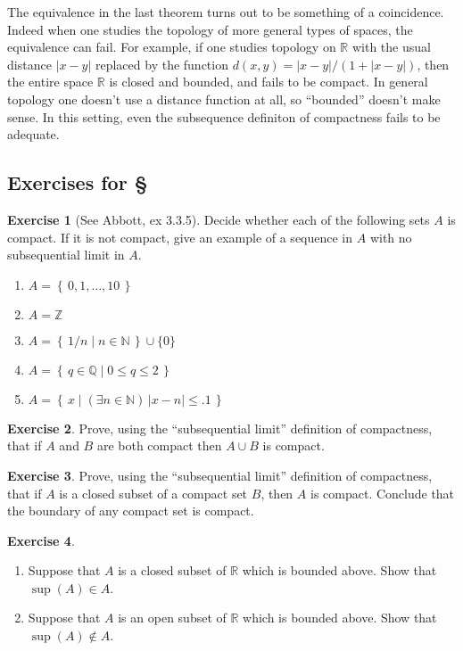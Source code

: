 \documentclass[11pt,oneside]{amsbook}
\newcommand{\set}[1]{\left\{\,#1\,\right\}}
\newcommand{\N}{\mathbb N}
\newcommand{\Z}{\mathbb Z}
\newcommand{\Q}{\mathbb Q}
\newcommand{\R}{\mathbb R}
\theoremstyle{definition}
\newtheorem{exerc}{Exercise}[section]
\theoremstyle{plain}
\theoremstyle{definition}
\theoremstyle{remark}
\numberwithin{equation}{section}
\numberwithin{figure}{section}
\begin{document}
The equivalence in the last theorem turns out to be something of a coincidence. Indeed when one studies the topology of more general types of spaces, the equivalence can fail. For example, if one studies topology on $\R$ with the usual distance $|x-y|$ replaced by the function $d(x,y)=|x-y|/(1+|x-y|)$, then the entire space $\R$ is closed and bounded, and fails to be compact. In general topology one doesn't use a distance function at all, so ``bounded'' doesn't make sense. In this setting, even the subsequence definiton of compactness fails to be adequate.

\newpage
\subsection*{Exercises for \S \thesection}

\begin{exerc}[See Abbott, ex 3.3.5]
  Decide whether each of the following sets $A$ is compact. If it is not compact, give an example of a sequence in $A$ with no subsequential limit in $A$.
  \begin{enumerate}
    \item $A=\set{0,1,\ldots,10}$
    \item $A=\Z$
    \item $A=\set{1/n\mid n\in\N}\cup\{0\}$
    \item $A=\set{q\in\Q\mid0\leq q\leq2}$
    \item $A=\set{x\mid (\exists n\in\N)\,|x-n|\leq.1}$
  \end{enumerate}
\end{exerc}

\begin{exerc}
  Prove, using the ``subsequential limit'' definition of compactness, that if $A$ and $B$ are both compact then $A\cup B$ is compact.
\end{exerc}

\begin{exerc}
  Prove, using the ``subsequential limit'' definition of compactness, that if $A$ is a closed subset of a compact set $B$, then $A$ is compact. Conclude that the boundary of any compact set is compact.
\end{exerc}

\begin{exerc}
  \begin{enumerate}
    \item Suppose that $A$ is a closed subset of $\R$ which is bounded above. Show that $\sup(A)\in A$.
    \item Suppose that $A$ is an open subset of $\R$ which is bounded above. Show that $\sup(A)\notin A$.
  \end{enumerate}
\end{exerc}
\end{document}
